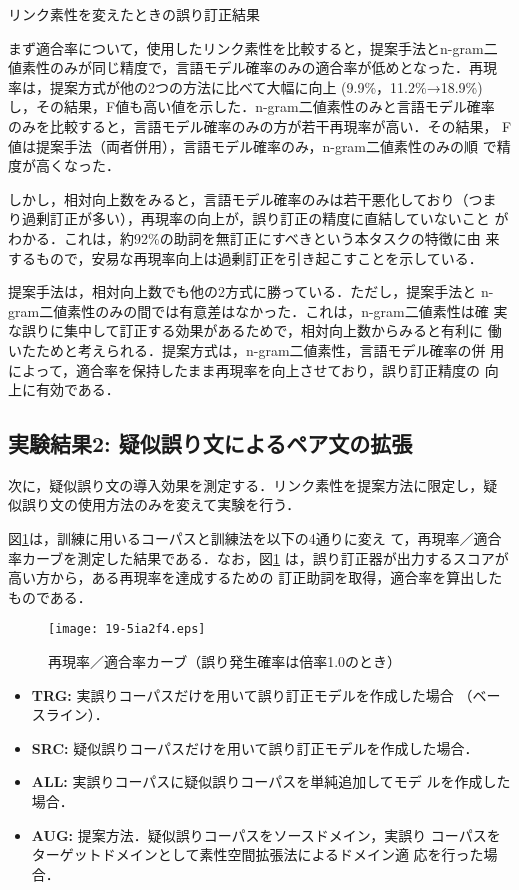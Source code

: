 \documentclass[japanese]{jnlp_1.4}
\begin{document}
\begin{table}[b]
\caption{リンク素性を変えたときの誤り訂正結果}
\label{tbl-exp-results}

\end{table}

まず適合率について，使用したリンク素性を比較すると，提案手法とn-gram二
値素性のみが同じ精度で，言語モデル確率のみの適合率が低めとなった．再現
率は，提案方式が他の2つの方法に比べて大幅に向上 (9.9\%，11.2\%→18.9\%) 
し，その結果，F値も高い値を示した．n-gram二値素性のみと言語モデル確率
のみを比較すると，言語モデル確率のみの方が若干再現率が高い．その結果，
F値は提案手法（両者併用），言語モデル確率のみ，n-gram二値素性のみの順
で精度が高くなった．

しかし，相対向上数をみると，言語モデル確率のみは若干悪化しており（つま
り過剰訂正が多い），再現率の向上が，誤り訂正の精度に直結していないこと
がわかる．これは，約92\%の助詞を無訂正にすべきという本タスクの特徴に由
来するもので，安易な再現率向上は過剰訂正を引き起こすことを示している．

提案手法は，相対向上数でも他の2方式に勝っている．ただし，提案手法と
n-gram二値素性のみの間では有意差はなかった．これは，n-gram二値素性は確
実な誤りに集中して訂正する効果があるためで，相対向上数からみると有利に
働いたためと考えられる．提案方式は，n-gram二値素性，言語モデル確率の併
用によって，適合率を保持したまま再現率を向上させており，誤り訂正精度の
向上に有効である．



\subsection{実験結果2: 疑似誤り文によるペア文の拡張}

次に，疑似誤り文の導入効果を測定する．リンク素性を提案方法に限定し，疑
似誤り文の使用方法のみを変えて実験を行う．

図\ref{fig-graph1}は，訓練に用いるコーパスと訓練法を以下の4通りに変え
て，再現率／適合率カーブを測定した結果である．なお，図\ref{fig-graph1}
は，誤り訂正器が出力するスコアが高い方から，ある再現率を達成するための
訂正助詞を取得，適合率を算出したものである．

\begin{figure}[b]
\begin{center}
\texttt{[image: 19-5ia2f4.eps]}
\end{center}
\caption{再現率／適合率カーブ（誤り発生確率は倍率1.0のとき）}
\label{fig-graph1}
\end{figure}

\begin{itemize}
\item \textbf{TRG:} 実誤りコーパスだけを用いて誤り訂正モデルを作成した場合
（ベースライン）．
\item \textbf{SRC:} 疑似誤りコーパスだけを用いて誤り訂正モデルを作成した場合．
\item \textbf{ALL:} 実誤りコーパスに疑似誤りコーパスを単純追加してモデ
ルを作成した場合．
\item \textbf{AUG:} 提案方法．疑似誤りコーパスをソースドメイン，実誤り
コーパスをターゲットドメインとして素性空間拡張法によるドメイン適
応を行った場合．
\end{itemize}
\end{document}
